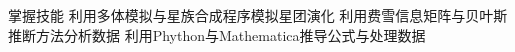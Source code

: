 
\begin{rubric}{掌握技能}
    \entry*[]
    利用多体模拟与星族合成程序模拟星团演化
    \entry*[]
    利用费雪信息矩阵与贝叶斯推断方法分析数据 
    \entry*[]
    利用Phython与Mathematica推导公式与处理数据
\end{rubric}
